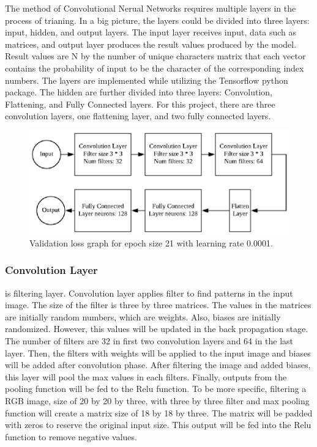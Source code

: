 The method of Convolutional Nerual Networks requires multiple layers in the process of trianing.
In a big picture, the layers could be divided into three layers: input, hidden, and output layers.
The input layer receives input, data such as matrices, and output layer produces the result values produced
by the model. Result values are N by the number of unique characters matrix that each vector contains the
probability of input to be the character of the corresponding index numbers. The layers are implemented while
utilizing the Tensorflow python package.
\newline
\newline
\indent
The hidden are further divided into three layers: Convolution, Flattening, and Fully Connected layers.
For this project, there are three convolution layers, one flattening layer, and two fully connected layers.
    \begin{figure}
        \includegraphics[width=\textwidth, scale=0.25]{flow.eps}
        \caption{Validation loss graph for epoch size 21 with learning rate 0.0001.\cite{sachan_2017}} \label{Figure1}
    \end{figure}

\subsubsection{Convolution Layer} is filtering layer.
Convolution layer applies filter to find patterns in the input image. The size of the filter is three by three matrices. The values
in the matrices are initially random numbers, which are weights. Also, biases are initially randomized.
However, this values will be updated in the back propagation
stage.
\newline
\newline
\indent
The number of filters are 32 in first two convolution layers and 64 in the last layer. Then, the filters with
weights will be applied to the input image and biases will be added after convolution phase. After filtering the
image and added biases, this layer will pool the max values in each filters. Finally, outputs from the pooling
function will be fed to the Relu function.
\newline
\newline
\indent
To be more specific, filtering a RGB image, size of 20 by 20 by three, with three by three filter and max pooling
function will create a matrix size of 18 by 18 by three. The matrix will be padded with zeros to reserve the original input
size. This output will be fed into the Relu function to remove negative values.

